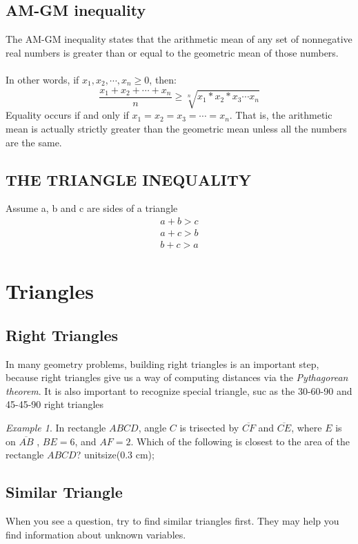 \documentclass[10pt]{article}
\theoremstyle{remark}
\newtheorem*{example}{Example}
\begin{document}
\subsection{AM-GM inequality} 
The AM-GM inequality states that the arithmetic mean of any set of nonnegative real numbers is greater than or 
equal to the geometric mean of those numbers.\\ \\
In other words, if $x_1, x_2, \cdots, x_n \geq 0$, then:
\[
	\frac{x_1 + x_2 + \cdots + x_n}{n} \geq \sqrt[n]{x_1*x_2*x_3\cdots x_n}
\]
Equality occurs if and only if $x_1 = x_2 = x_3 = \cdots = x_n$. That is, the arithmetic mean is actually
strictly greater than the geometric mean unless all the numbers are the same.\\

\subsection{THE TRIANGLE INEQUALITY}
Assume a, b and c are sides of a triangle
\begin{gather}
	a + b > c \\
	a + c > b \\
	b + c > a
\end{gather}
\newpage
\section{Triangles}
\subsection{Right Triangles}
In many geometry problems, building right triangles is an important step, because right triangles give us a way of 
computing distances via the \textit{Pythagorean theorem}. It is also important to recognize special triangle, 
suc as the 30-60-90 and 45-45-90 right triangles \\
\begin{example}
	In rectangle $ABCD$, angle $C$ is trisected by $\overline{CF}$ and $\overline{CE}$, where $E$ is on $\overline{AB}$
	, $BE = 6$, and $AF = 2$. Which of the following is closest to the area of the rectangle $ABCD$? 
	unitsize(0.3 cm);

\end{example}
\subsection{Similar Triangle}
When you see a question, try to find similar triangles first. They may help you find information about unknown 
variables. \\
\end{document}
